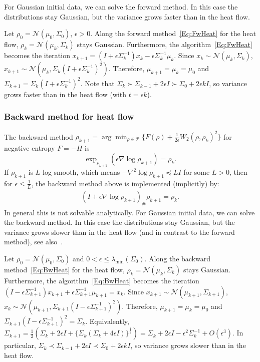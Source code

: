 \documentclass[final,12pt]{colt2018}
\newcommand{\N}{\mathcal{N}}
\renewcommand{\P}{\mathcal{P}}
\begin{document}
For Gaussian initial data, we can solve the forward method.
In this case the distributions stay Gaussian, but the variance grows faster than in the heat flow.

\begin{example}
Let $\rho_0 = \N(\mu_0,\Sigma_0)$, $\epsilon > 0$.
Along the forward method~\eqref{Eq:FwHeat} for the heat flow, $\rho_k = \N(\mu_k,\Sigma_k)$ stays Gaussian.
Furthermore, the algorithm~\eqref{Eq:FwHeat} becomes the iteration
$x_{k+1} = (I + \epsilon \Sigma_k^{-1}) x_k - \epsilon \Sigma_k^{-1} \mu_k.$
Since $x_k \sim \N(\mu_k,\Sigma_k)$, $x_{k+1} \sim \N(\mu_k, \Sigma_k(I + \epsilon \Sigma_k^{-1})^2).$
Therefore, $\mu_{k+1} = \mu_k = \mu_0$ and $\Sigma_{k+1} = \Sigma_k(I + \epsilon \Sigma_k^{-1})^2$. 
Note that $\Sigma_k \succ \Sigma_{k-1} + 2\epsilon I \succ \Sigma_0 + 2\epsilon kI$, so 
variance grows faster than in the heat flow (with $t = \epsilon k$).
\end{example}


\subsubsection{Backward method for heat flow}
\label{Sec:BwHeat}

The backward method $\rho_{k+1} = \arg\min_{\rho \in \P} \{F(\rho) + \frac{1}{2\epsilon} W_2(\rho,\rho_k)^2\}$ for negative entropy  $F = -H$ is
$$\exp_{\rho_{k+1}}(\epsilon \nabla \log \rho_{k+1}) = \rho_k.$$
If $\rho_{k+1}$ is $L$-log-smooth, which means $-\nabla^2 \log \rho_{k+1} \preceq LI$ for some $L > 0$, then for $\epsilon \le \frac{1}{L}$, the backward method above is implemented (implicitly) by:
\begin{align}\label{Eq:BwHeat}
(I + \epsilon \nabla \log \rho_{k+1})_\# \rho_{k+1} = \rho_k.
\end{align}
In general this is not solvable analytically.
For Gaussian initial data, we can solve the backward method.
In this case the distributions stay Gaussian, but the variance grows slower than in the heat flow (and in contrast to the forward method), see also~\cite[Remark, $\S3$]{CG03}.


\begin{example}
Let $\rho_0 = \N(\mu_0,\Sigma_0)$ and $0 < \epsilon \le \lambda_{\min}(\Sigma_0)$.
Along the backward method~\eqref{Eq:BwHeat} for the heat flow, $\rho_k = \N(\mu_k,\Sigma_k)$ stays Gaussian.
Furthermore, the algorithm~\eqref{Eq:BwHeat} becomes the iteration
$(I - \epsilon \Sigma_{k+1}^{-1}) x_{k+1} + \epsilon \Sigma_{k+1}^{-1} \mu_{k+1} = x_k$.
Since $x_{k+1} \sim \N(\mu_{k+1},\Sigma_{k+1})$, $x_k \sim \N(\mu_{k+1}, \Sigma_{k+1}(I - \epsilon \Sigma_{k+1}^{-1})^2).$
Therefore, $\mu_{k+1} = \mu_k = \mu_0$ and $\Sigma_{k+1}(I - \epsilon \Sigma_{k+1}^{-1})^2 = \Sigma_k$.
Equivalently, $\Sigma_{k+1} = \frac{1}{2}(\Sigma_k+2\epsilon I + \{\Sigma_k(\Sigma_k+4\epsilon I)\}^{\frac{1}{2}})
= \Sigma_k + 2\epsilon I - \epsilon^2 \Sigma_k^{-1} + O(\epsilon^3)$.
In particular, $\Sigma_k \prec \Sigma_{k-1} + 2\epsilon I \prec \Sigma_0 + 2\epsilon k I$, so 
variance grows slower than in the heat flow. 
\end{example}
\end{document}
